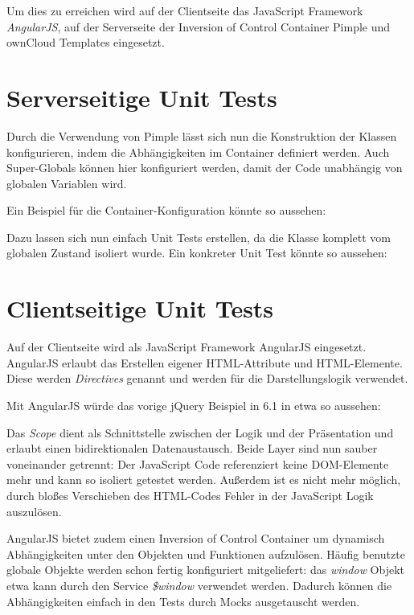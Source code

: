 \documentclass[a4paper,bibtotoc,oneside]{scrbook}
\begin{document}
Um dies zu erreichen wird auf der Clientseite das JavaScript Framework \emph{AngularJS}\cite{angular}, auf der Serverseite der Inversion of Control Container Pimple\cite{pimple} und ownCloud Templates eingesetzt.


\section{Serverseitige Unit Tests}
Durch die Verwendung von Pimple lässt sich nun die Konstruktion der Klassen konfigurieren, indem die Abhängigkeiten im Container definiert werden. Auch Super-Globals können hier konfiguriert werden, damit der Code unabhängig von globalen Variablen wird.

Ein Beispiel für die Container-Konfiguration könnte so aussehen:


Dazu lassen sich nun einfach Unit Tests erstellen, da die Klasse komplett vom globalen Zustand isoliert wurde. Ein konkreter Unit Test könnte so aussehen:



\newpage

\section{Clientseitige Unit Tests}
Auf der Clientseite wird als JavaScript Framework AngularJS eingesetzt. AngularJS erlaubt das Erstellen eigener HTML-Attribute und HTML-Elemente. Diese werden \emph{Directives} genannt und werden für die Darstellungslogik verwendet.

Mit AngularJS würde das vorige jQuery Beispiel in 6.1 in etwa so aussehen:




Das \emph{Scope} dient als Schnittstelle zwischen der Logik und der Präsentation und erlaubt einen bidirektionalen Datenaustausch. Beide Layer sind nun sauber voneinander getrennt: Der JavaScript Code referenziert keine DOM-Elemente mehr und kann so isoliert getestet werden. Außerdem ist es nicht mehr möglich, durch bloßes Verschieben des HTML-Codes Fehler in der JavaScript Logik auszulösen.

AngularJS bietet zudem einen Inversion of Control Container um dynamisch Abhängigkeiten unter den Objekten und Funktionen aufzulösen. Häufig benutzte globale Objekte werden schon fertig konfiguriert mitgeliefert: das \emph{window} Objekt etwa kann durch den Service \emph{\$window} verwendet werden. Dadurch können die Abhängigkeiten einfach in den Tests durch Mocks ausgetauscht werden.
\end{document}
